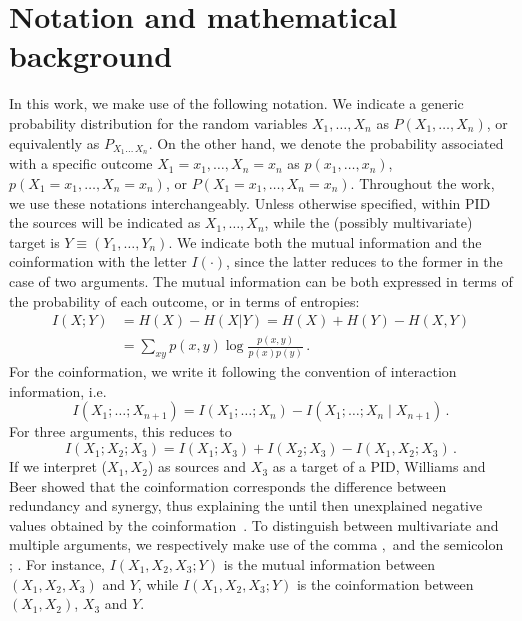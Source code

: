 \documentclass{article}
\newcommand{\Xs}{X_1,\ldots,X_n}
\begin{document}
\section{Notation and mathematical background} \label{appendix:mathematical_bg}
In this work, we make use of the following notation. 
We indicate a generic probability distribution for the random variables $\Xs$ as $P(\Xs)$, or equivalently as $P_{X_1\ldots \,X_n}$. On the other hand, we denote the probability associated with a specific outcome ${X_1=x_1,\ldots,X_n=x_n}$ as ${p(x_1,\ldots,x_n)}$, ${p(X_1=x_1,\ldots,X_n=x_n)}$, or ${P(X_1=x_1,\ldots,X_n=x_n)}$. Throughout the work, we use these notations interchangeably.
Unless otherwise specified, within PID the sources will be indicated as $\Xs$, while the (possibly multivariate) target is $Y\equiv (Y_1,\ldots,Y_n)$.
We indicate both the mutual information and the coinformation with the letter $I(\cdot)$, since the latter reduces to the former in the case of two arguments. The mutual information can be both expressed in terms of the probability of each outcome, or in terms of entropies:
\begin{equation}
\begin{aligned}
    I(X;Y) & = H(X) - H(X|Y) = H(X) + H(Y) - H(X,Y) \\
    & = \sum_{xy} p(x,y) \log \frac{p(x,y)}{p(x)p(y)} \,.
\end{aligned}
\end{equation}
For the coinformation, we write it following the convention of interaction information, i.e.\
\begin{equation}
    I(X_1;\ldots;X_{n+1}) = I(X_1;\ldots;X_n) - I(X_1;\ldots;X_n\mid X_{n+1}) \,.
\end{equation}
For three arguments, this reduces to 
\begin{equation}
    I(X_1;X_2;X_3) = I(X_1;X_3)+I(X_2;X_3)-I(X_1,X_2;X_3) \,.
\end{equation}
If we interpret ($X_1,X_2$) as sources and $X_3$ as a target of a PID, Williams and Beer showed that the coinformation corresponds the difference between redundancy and synergy, thus explaining the until then unexplained negative values obtained by the coinformation~\cite{williams2010nonnegative}.
To distinguish between multivariate and multiple arguments, we respectively make use of the comma $,$ and the semicolon $;\,$. For instance, $I(X_1,X_2,X_3;Y)$ is the mutual information between $(X_1,X_2,X_3)$ and $Y$, while $I(X_1,X_2,X_3;Y)$ is the coinformation between $(X_1,X_2)$, $X_3$ and $Y$. 
\end{document}
